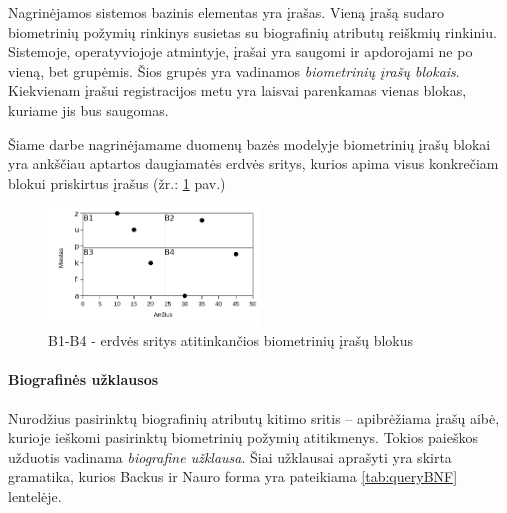 Nagrinėjamos sistemos bazinis elementas yra įrašas.
Vieną įrašą sudaro biometrinių požymių rinkinys susietas su biografinių atributų reiškmių rinkiniu.
Sistemoje, operatyviojoje atmintyje, įrašai yra saugomi ir apdorojami ne po vieną, bet grupėmis.
Šios grupės yra vadinamos {\it biometrinių įrašų blokais}.
Kiekvienam įrašui registracijos metu yra laisvai parenkamas vienas blokas, kuriame jis bus saugomas.

Šiame darbe nagrinėjamame duomenų bazės modelyje biometrinių įrašų blokai yra ankščiau aptartos daugiamatės erdvės sritys, kurios apima visus konkrečiam blokui priskirtus įrašus (žr.: \ref{img:multidimensionalPartitionedGallery} pav.)

\begin{figure}[H]
\begin{center}
\includegraphics[width=0.5\textwidth]{img/MultidimensionalPartitionedGallery.png}
\caption{B1-B4 - erdvės sritys atitinkančios biometrinių įrašų blokus}
\label{img:multidimensionalPartitionedGallery}
\end{center}
\end{figure}



\paragraph{Biografinės užklausos}

Nurodžius pasirinktų biografinių atributų kitimo sritis -- apibrėžiama įrašų aibė, kurioje ieškomi pasirinktų biometrinių požymių atitikmenys.
Tokios paieškos užduotis vadinama {\it biografine užklausa}.
Šiai užklausai aprašyti yra skirta gramatika, kurios Backus ir Nauro forma \cite{mccracken2003backus} yra pateikiama \ref{tab:queryBNF} lentelėje.

